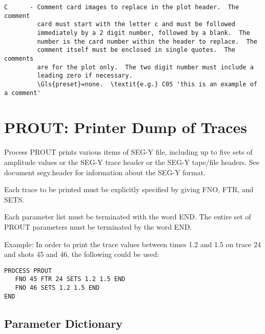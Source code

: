 \begin{verbatim}
C      - Comment card images to replace in the plot header.  The comment
         card must start with the letter c and must be followed
         immediately by a 2 digit number, followed by a blank.  The
         number is the card number within the header to replace.  The
         comment itself must be enclosed in single quotes.  The comments
         are for the plot only.  The two digit number must include a
         leading zero if necessary.
         \Gls{preset}=none.  \textit{e.g.} C05 'this is an example of a comment'
\end{verbatim}

\section{PROUT: Printer Dump of Traces}
\label{cmd_prout}

Process PROUT prints various items of SEG-Y file, including up to five
sets of amplitude values or the SEG-Y trace header or the SEG-Y
tape/file headers.  See document segy.header for information about
the SEG-Y format.

Each trace to be printed must be explicitly specified by giving FNO,
FTR, and SETS.

Each parameter list must be terminated with the word END.  The entire
set of PROUT parameters must be terminated by the word END.

Example: In order to print the trace values between times 1.2 and 1.5 on trace 24
and \glspl{shot} 45 and 46, the following could be used:

\begin{verbatim}
PROCESS PROUT
   FNO 45 FTR 24 SETS 1.2 1.5 END
   FNO 46 SETS 1.2 1.5 END
END
\end{verbatim}

\subsection{Parameter Dictionary}

